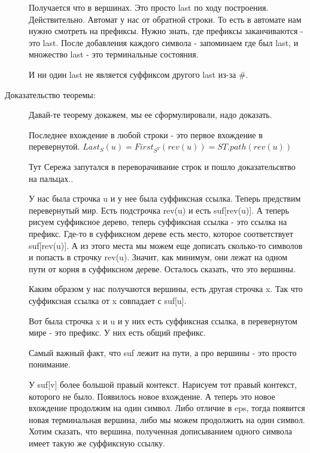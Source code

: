 \begin{description}
    Получается что в вершинах. Это просто last по 
    ходу построения. Действительно. Автомат у нас 
    от обратной строки. То есть в автомате нам 
    нужно смотреть на префиксы. Нужно
    знать, где префиксы заканчиваются - это last.
    После добавления каждого символа - запоминаем 
    где был last, и множество last - это терминальные 
    состояния. 

    И ни один last не является суффиксом другого last из-за \#.
     
    \item[Доказательство теоремы:]
    Давай-те теорему докажем, мы ее сформулировали, надо 
    доказать.

    \begin{lemma}
    Последнее вхождение в любой строки - это первое вхождение в 
    перевернутой.  
    $Last_{S}(u) = First_{S^T}(rev(u)) = ST.path(rev(u))$
    \end{lemma}

    Тут Сережа запутался в переворачивание строк и пошло 
    доказательсвтво на пальцах..

   
    У нас была строчка u и у нее была суффиксная ссылка. 
    Теперь предствим перевернутый мир. Есть 
    подстрочка rev(u) и есть suf[rev(u)]. А теперь
    рисуем суффиксное дерево, теперь
    суффиксная ссылка - это ссылка на префикс.
    Где-то в суффиксном дереве есть
    место, которое соответствует suf[rev(u)].
    А из этого места мы
    можем еще дописать сколько-то символов и попасть в
    строчку rev(u).  Значит,
    как минимум, они лежат на одном пути от корня в суффиксном дереве.
    Осталось сказать, что это вершины.

    Каким образом у нас получаются
    вершины, есть другая строчка x. Так что суффиксная
    ссылка от x совпадает с suf[u].

    Вот была строчка x и u и у них есть суффиксная ссылка, 
    в перевернутом мире - это префикс. У них есть 
    общий префикс.

    Самый важный факт, что suf лежит на пути, а про вершины - это
    просто понимание.  
    
    У suf[v] более большой правый контекст. Нарисуем тот правый контекст, 
    которого не было. 
    Появилось новое вхождение. А теперь это новое вхождение продолжим 
    на один символ. Либо отличие в eps, тогда появится новая
    терминальная вершина, либо мы можем продолжить
    на один символ. Хотим сказать, что 
    вершина, полученная дописыванием 
    одного символа имеет такую же суффиксную 
    ссылку. 


\end{description}
